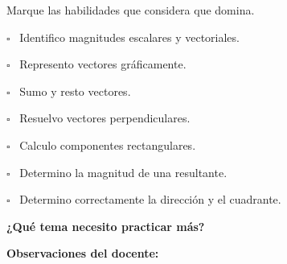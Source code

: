 \documentclass[11pt,letterpaper]{article}
\newcommand{\casilla}{
$\square$
}
\begin{document}
\begin{tcolorbox}[
 colback=celeste,
 colframe=azul,
 title=Revisión de mi aprendizaje
]

Marque las habilidades que
considera que domina.

\vspace{0.3cm}

\casilla\ Identifico magnitudes
escalares y vectoriales.

\vspace{0.4cm}

\casilla\ Represento vectores
gráficamente.

\vspace{0.4cm}

\casilla\ Sumo y resto vectores.

\vspace{0.4cm}

\casilla\ Resuelvo vectores
perpendiculares.

\vspace{0.4cm}

\casilla\ Calculo componentes
rectangulares.

\vspace{0.4cm}

\casilla\ Determino la magnitud
de una resultante.

\vspace{0.4cm}

\casilla\ Determino correctamente
la dirección y el cuadrante.

\end{tcolorbox}

\vspace{0.5cm}

\textbf{¿Qué tema necesito practicar más?}

\vspace{2cm}

\hrulefill

\vspace{0.5cm}

\textbf{Observaciones del docente:}

\vspace{2cm}

\hrulefill
\end{document}
